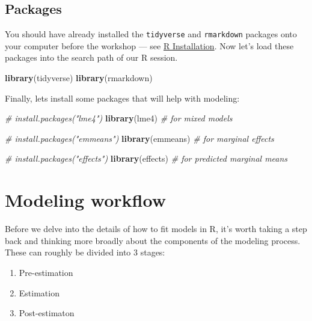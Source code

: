 \documentclass[
]{book}
\newenvironment{Shaded}{\begin{snugshade}}{\end{snugshade}}
\newcommand{\CommentTok}[1]{\textcolor[rgb]{0.56,0.35,0.01}{\textit{#1}}}
\newcommand{\KeywordTok}[1]{\textcolor[rgb]{0.13,0.29,0.53}{\textbf{#1}}}
\newcommand{\NormalTok}[1]{#1}
\providecommand{\tightlist}{%
  \setlength{\itemsep}{0pt}\setlength{\parskip}{0pt}}
\begin{document}
\hypertarget{packages}{%
\subsection{Packages}\label{packages}}

You should have already installed the \texttt{tidyverse} and \texttt{rmarkdown}
packages onto your computer before the workshop
--- see \href{./Rinstall.html}{R Installation}.
Now let's load these packages into the search path of our R session.

\begin{Shaded}
\begin{Highlighting}[]
\KeywordTok{library}\NormalTok{(tidyverse)}
\KeywordTok{library}\NormalTok{(rmarkdown)}
\end{Highlighting}
\end{Shaded}

Finally, lets install some packages that will help with modeling:

\begin{Shaded}
\begin{Highlighting}[]
\CommentTok{\# install.packages("lme4")}
\KeywordTok{library}\NormalTok{(lme4)  }\CommentTok{\# for mixed models}

\CommentTok{\# install.packages("emmeans")}
\KeywordTok{library}\NormalTok{(emmeans)  }\CommentTok{\# for marginal effects}

\CommentTok{\# install.packages("effects")}
\KeywordTok{library}\NormalTok{(effects)  }\CommentTok{\# for predicted marginal means}
\end{Highlighting}
\end{Shaded}

\hypertarget{modeling-workflow}{%
\section{Modeling workflow}\label{modeling-workflow}}

Before we delve into the details of how to fit models in R, it's worth taking a step
back and thinking more broadly about the components of the modeling process. These
can roughly be divided into 3 stages:

\begin{enumerate}
\def\labelenumi{\arabic{enumi}.}
\tightlist
\item
  Pre-estimation
\item
  Estimation
\item
  Post-estimaton
\end{enumerate}
\end{document}
